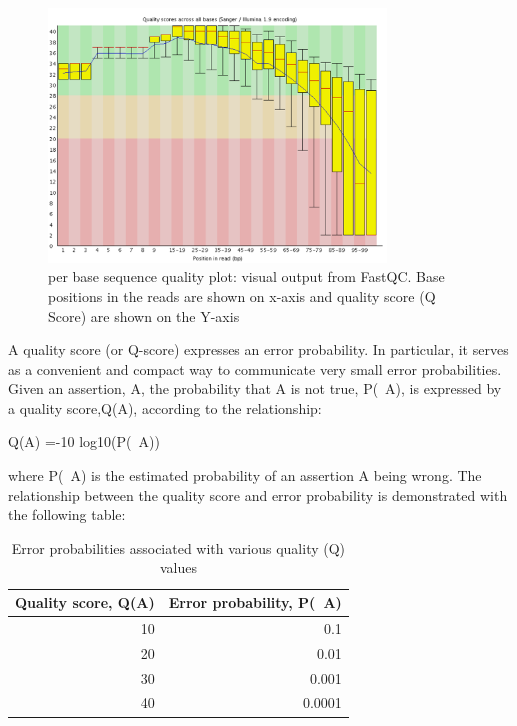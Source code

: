 \begin{figure}[htb]
\centering
\includegraphics[width=0.8\textwidth]{ngs-qc/bad_example.png}
\caption{per base sequence quality plot: visual output from FastQC. Base positions in the reads are shown on x-axis and quality score (Q Score) are shown on the Y-axis}
\label{fig:bad_example_plot}
\end{figure}

\begin{information}
A quality score (or Q-score) expresses an error probability.  In particular, it
serves as a convenient and compact way to communicate very small error
probabilities.
Given an assertion, A, the probability that A is not true, P(~A), is expressed
by a quality score,Q(A), according to the relationship:

Q(A) =-10 log10(P(~A))

where P(~A) is the estimated probability of an assertion A being wrong.
The relationship between the quality score and error probability is demonstrated
with the following table:

\begin{table}[htbp]
  \centering
  \caption{Error probabilities associated with various quality (Q) values}
    \begin{tabular}{rr}
    \toprule
    \textbf{Quality score, Q(A)} & \textbf{Error probability, P(~A)} \\
    \midrule
    10    & 0.1 \\
    20    & 0.01 \\
    30    & 0.001 \\
    40    & 0.0001 \\
    \bottomrule
    \end{tabular}%
  \label{tab:addlabel}%
\end{table}%

\end{information}

